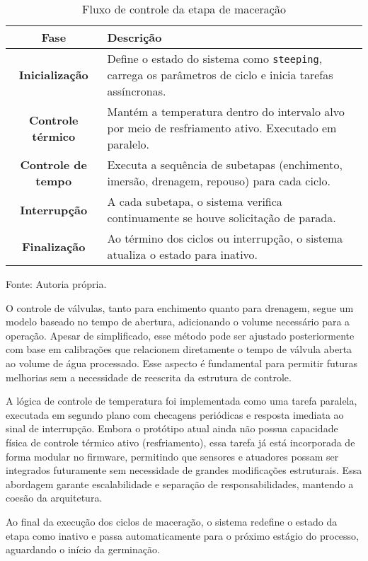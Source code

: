 \begin{table}[H]
    \caption{Fluxo de controle da etapa de maceração}
    \label{tab:maceracao-fluxo}
    \centering
    \begin{tabular}{>{\bfseries}c p{10cm}}
        \hline
        Fase & Descrição \\
        \hline
        Inicialização & Define o estado do sistema como \texttt{steeping}, carrega os parâmetros de ciclo e inicia tarefas assíncronas. \\
        Controle térmico & Mantém a temperatura dentro do intervalo alvo por meio de resfriamento ativo. Executado em paralelo. \\
        Controle de tempo & Executa a sequência de subetapas (enchimento, imersão, drenagem, repouso) para cada ciclo. \\
        Interrupção & A cada subetapa, o sistema verifica continuamente se houve solicitação de parada. \\
        Finalização & Ao término dos ciclos ou interrupção, o sistema atualiza o estado para inativo. \\
        \hline
    \end{tabular}
    
    {\centering\footnotesize Fonte: Autoria própria.\par}
\end{table}

O controle de válvulas, tanto para enchimento quanto para drenagem, segue um modelo baseado no tempo de abertura, adicionando o volume necessário para a operação. Apesar de simplificado, esse método pode ser ajustado posteriormente com base em calibrações que relacionem diretamente o tempo de válvula aberta ao volume de água processado. Esse aspecto é fundamental para permitir futuras melhorias sem a necessidade de reescrita da estrutura de controle.

A lógica de controle de temperatura foi implementada como uma tarefa paralela, executada em segundo plano com checagens periódicas e resposta imediata ao sinal de interrupção. Embora o protótipo atual ainda não possua capacidade física de controle térmico ativo (resfriamento), essa tarefa já está incorporada de forma modular no firmware, permitindo que sensores e atuadores possam ser integrados futuramente sem necessidade de grandes modificações estruturais. Essa abordagem garante escalabilidade e separação de responsabilidades, mantendo a coesão da arquitetura.

Ao final da execução dos ciclos de maceração, o sistema redefine o estado da etapa como inativo e passa automaticamente para o próximo estágio do processo, aguardando o início da germinação.

